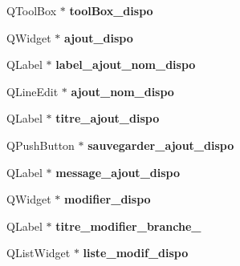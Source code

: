 \begin{DoxyCompactItemize}
\item 
\hypertarget{class_ui___administration_ab4b7b7dfb394daa2958b6869a8f8a03c}{Q\+Tool\+Box $\ast$ {\bfseries tool\+Box\+\_\+dispo}}\label{class_ui___administration_ab4b7b7dfb394daa2958b6869a8f8a03c}

\item 
\hypertarget{class_ui___administration_ac15f3b07b0602b8420de69bcddbd55c4}{Q\+Widget $\ast$ {\bfseries ajout\+\_\+dispo}}\label{class_ui___administration_ac15f3b07b0602b8420de69bcddbd55c4}

\item 
\hypertarget{class_ui___administration_a6055f434f35758fa42a88110160dbe64}{Q\+Label $\ast$ {\bfseries label\+\_\+ajout\+\_\+nom\+\_\+dispo}}\label{class_ui___administration_a6055f434f35758fa42a88110160dbe64}

\item 
\hypertarget{class_ui___administration_a8a2998779ca8b94bd0f8a72df332e8e6}{Q\+Line\+Edit $\ast$ {\bfseries ajout\+\_\+nom\+\_\+dispo}}\label{class_ui___administration_a8a2998779ca8b94bd0f8a72df332e8e6}

\item 
\hypertarget{class_ui___administration_accc01a1a5aeeebf7a26cf97ccddbcfee}{Q\+Label $\ast$ {\bfseries titre\+\_\+ajout\+\_\+dispo}}\label{class_ui___administration_accc01a1a5aeeebf7a26cf97ccddbcfee}

\item 
\hypertarget{class_ui___administration_a09731cae29adeb29ec71169028b3acce}{Q\+Push\+Button $\ast$ {\bfseries sauvegarder\+\_\+ajout\+\_\+dispo}}\label{class_ui___administration_a09731cae29adeb29ec71169028b3acce}

\item 
\hypertarget{class_ui___administration_a19113882849c0411ca436391188b43ca}{Q\+Label $\ast$ {\bfseries message\+\_\+ajout\+\_\+dispo}}\label{class_ui___administration_a19113882849c0411ca436391188b43ca}

\item 
\hypertarget{class_ui___administration_a0aefb22b454e870ebbb36bbf71232928}{Q\+Widget $\ast$ {\bfseries modifier\+\_\+dispo}}\label{class_ui___administration_a0aefb22b454e870ebbb36bbf71232928}

\item 
\hypertarget{class_ui___administration_af3753ab183f755035e08c4d6ea434017}{Q\+Label $\ast$ {\bfseries titre\+\_\+modifier\+\_\+branche\+\_}}\label{class_ui___administration_af3753ab183f755035e08c4d6ea434017}

\item 
\hypertarget{class_ui___administration_ac001a44a1f10175ac98fb1c31ad49f7d}{Q\+List\+Widget $\ast$ {\bfseries liste\+\_\+modif\+\_\+dispo}}\label{class_ui___administration_ac001a44a1f10175ac98fb1c31ad49f7d}


\end{DoxyCompactItemize}
